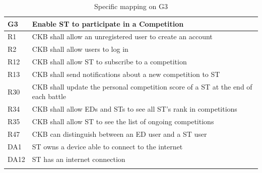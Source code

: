   \begin{longtable}{|l|p{12cm}| }
    \hline
    \textbf{G3} & \textbf{Enable ST to participate in a Competition}      \\
    \hline
    R1 & CKB shall allow an unregistered user to create an account \\
    \hline
    R2 & CKB shall allow users to log in \\
    \hline
    R12 & CKB shall allow ST to subscribe to a competition \\
    \hline
    R13 & CKB shall send notifications about a new competition to ST \\
    \hline
    R30 & CKB shall update the personal competition score of a ST at the end of each battle \\
    \hline
    R34 & CKB shall allow EDs and STs to see all ST’s rank in competitions \\
    \hline
    R35 & CKB shall allow ST to see the list of ongoing competitions \\
    \hline
    R47 & CKB can distinguish between an ED user and a ST user \\
    \hline
    DA1 & ST owns a device able to connect to the internet \\
    \hline
    DA12 & ST has an internet connection \\
    \hline

    \caption{Specific mapping on G3}
    \label{tab:mappingG3}
  \end{longtable}


